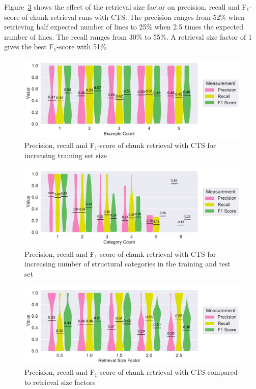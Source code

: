 \documentclass[\myrootdir/main.tex]{subfiles}
\begin{document}
Figure~\ref{fig:contextsizefactor-precision-recall-CTS} shows the effect of the retrieval size factor on precision, recall and F$_{1}$-score of chunk retrieval runs with CTS\@.
The precision ranges from 52\% when retrieving half expected number of lines to 25\% when 2.5 times the expected number of lines.
The recall ranges from 30\% to 55\%.
A retrieval size factor of 1 gives the best F$_{1}$-score with 51\%.

\begin{figure}[htbp]
		\centering
		\includegraphics[width=\textwidth, clip]{img/big-study/recall-precision-examplecount-CTS.pdf}
		\caption{Precision, recall and F$_{1}$-score of chunk retrieval with CTS for increasing training set size}
		\label{fig:recall-precision-examplecount-CTS}
\end{figure}

\begin{figure}[htbp]
		\centering
		\includegraphics[width=\textwidth, clip]{img/big-study/recall-precision-categorycount-CTS.pdf}
		\caption{Precision, recall and F$_{1}$-score of chunk retrieval with CTS for increasing number of structural categories in the training and test set}
		\label{fig:recall-precision-categorycount-CTS}
\end{figure}

\begin{figure}[htbp]
		\centering
		\includegraphics[width=\textwidth, clip]{img/big-study/contextsizefactor-precision-recall-CTS.pdf}
		\caption{Precision, recall and F$_{1}$-score of chunk retrieval with CTS compared to retrieval size factors}
		\label{fig:contextsizefactor-precision-recall-CTS}
\end{figure}
\end{document}
